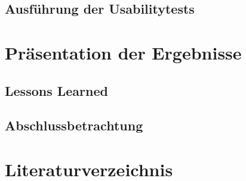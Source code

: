 \documentclass{scrreprt}
\begin{document}
\section{Ausführung der Usabilitytests}
\chapter{Präsentation der Ergebnisse}
\section{Lessons Learned}
\section{Abschlussbetrachtung}
\chapter{Literaturverzeichnis}
\nocite{*}
\printbibliography
\end{document}
